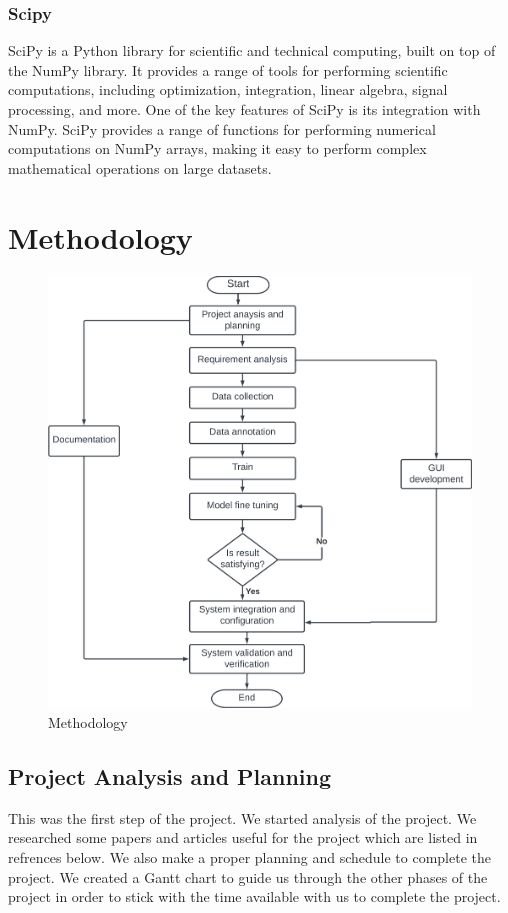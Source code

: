 \documentclass[12pt]{report}
\begin{document}
 \subsection{Scipy}
SciPy is a Python library for scientific and technical computing, built on top of the NumPy library. It provides a range of tools for performing scientific computations, including optimization, integration, linear algebra, signal processing, and more. One of the key features of SciPy is its integration with NumPy. SciPy provides a range of functions for performing numerical computations on NumPy arrays, making it easy to perform complex mathematical operations on large datasets.



\chapter{Methodology}
\begin{figure}[ht!]
    \centering
    \includegraphics[scale = 0.6]{Images/Methodology.png}
    \caption{Methodology}
\end{figure}
\section{Project Analysis and Planning}
This was the first step of the project. We started analysis of the project. We researched some papers and articles useful for the project which are listed in refrences below. We also make a proper planning and schedule to complete the project. We created a Gantt chart to guide us through the other phases of the project in order to stick with the time available with us to complete the project.
\end{document}
